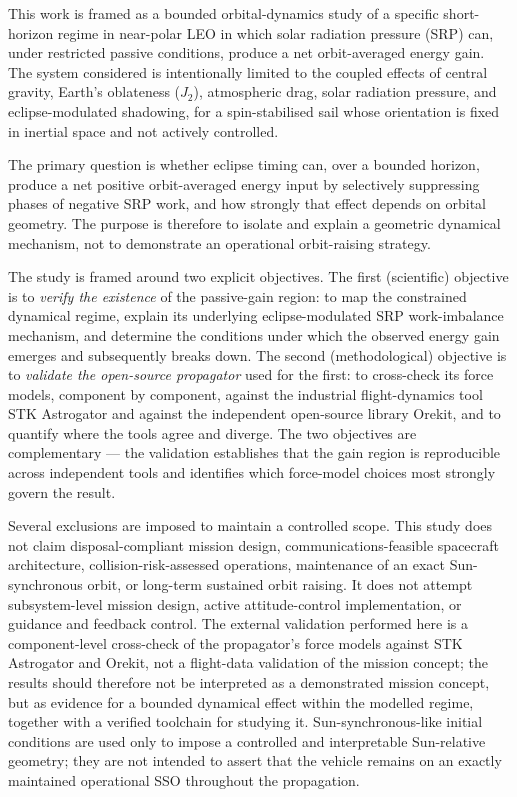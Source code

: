 
\noindent This work is framed as a bounded orbital-dynamics study of a specific short-horizon regime in near-polar LEO in which solar radiation pressure (SRP) can, under restricted passive conditions, produce a net orbit-averaged energy gain. The system considered is intentionally limited to the coupled effects of central gravity, Earth’s oblateness (\(J_2\)), atmospheric drag, solar radiation pressure, and eclipse-modulated shadowing, for a spin-stabilised sail whose orientation is fixed in inertial space and not actively controlled.

\vspace{0.5em}
\par\noindent The primary question is whether eclipse timing can, over a bounded horizon, produce a net positive orbit-averaged energy input by selectively suppressing phases of negative SRP work, and how strongly that effect depends on orbital geometry. The purpose is therefore to isolate and explain a geometric dynamical mechanism, not to demonstrate an operational orbit-raising strategy.

\vspace{0.5em}
\par\noindent The study is framed around two explicit objectives. The first (scientific) objective is to \emph{verify the existence} of the passive-gain region: to map the constrained dynamical regime, explain its underlying eclipse-modulated SRP work-imbalance mechanism, and determine the conditions under which the observed energy gain emerges and subsequently breaks down. The second (methodological) objective is to \emph{validate the open-source propagator} used for the first: to cross-check its force models, component by component, against the industrial flight-dynamics tool STK Astrogator and against the independent open-source library Orekit, and to quantify where the tools agree and diverge. The two objectives are complementary --- the validation establishes that the gain region is reproducible across independent tools and identifies which force-model choices most strongly govern the result.

\vspace{0.5em}
\par\noindent Several exclusions are imposed to maintain a controlled scope. This study does not claim disposal-compliant mission design, communications-feasible spacecraft architecture, collision-risk-assessed operations, maintenance of an exact Sun-synchronous orbit, or long-term sustained orbit raising. It does not attempt subsystem-level mission design, active attitude-control implementation, or guidance and feedback control. The external validation performed here is a component-level cross-check of the propagator's force models against STK Astrogator and Orekit, not a flight-data validation of the mission concept; the results should therefore not be interpreted as a demonstrated mission concept, but as evidence for a bounded dynamical effect within the modelled regime, together with a verified toolchain for studying it. Sun-synchronous-like initial conditions are used only to impose a controlled and interpretable Sun-relative geometry; they are not intended to assert that the vehicle remains on an exactly maintained operational SSO throughout the propagation.
\FloatBarrier